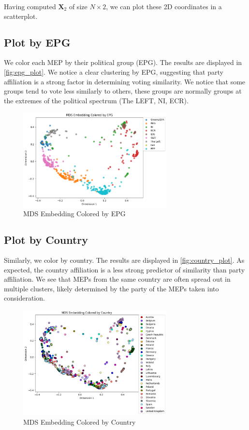 \documentclass{article}
\begin{document}
Having computed \(\mathbf{X}_2\) of size \(N \times 2\), we can plot these 2D coordinates in a scatterplot.

\subsection{Plot by EPG}

We color each MEP by their political group (EPG).  The results are displayed in \autoref{fig:epg_plot}.
We notice a clear clustering by EPG, suggesting that party affiliation is a strong factor in determining voting similarity.
We notice that some groups tend to vote less similarly to others, these groups are normally groups at the extremes of the political spectrum (The LEFT, NI, ECR).

\begin{figure}
    \centering
    \includegraphics[width=0.7\textwidth]{MDS_EPG.png}
    \caption{MDS Embedding Colored by EPG}
    \label{fig:epg_plot}
\end{figure}

\subsection{Plot by Country}

Similarly, we color by country. The results are displayed in \autoref{fig:country_plot}. As expected, the country affiliation is a less strong predictor of similarity than party affiliation. 
We see that MEPs from the same country are often spread out in multiple clusters, likely determined by the party of the MEPs taken into consideration.
\begin{figure}
    \centering
    \includegraphics[width=0.7\textwidth]{MDS_Country.png}
    \caption{MDS Embedding Colored by Country}
    \label{fig:country_plot}
\end{figure}
\end{document}

